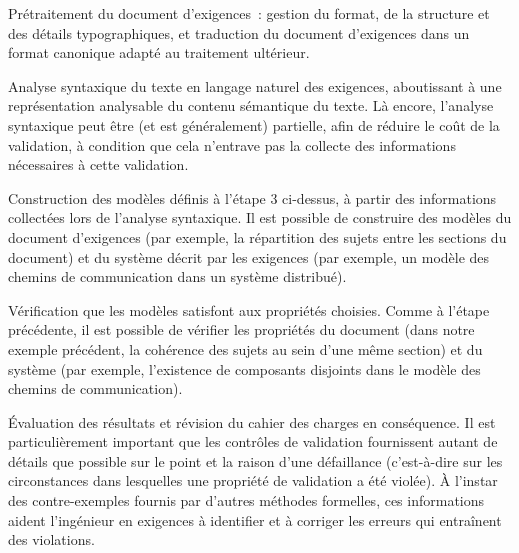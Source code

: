 {{    \item[][---] Prétraitement du document d'exigences~: gestion du format, de la structure et des détails typographiques, et traduction du document d'exigences dans un format canonique adapté au traitement ultérieur.
    \item[][---] Analyse syntaxique du texte en langage naturel des exigences, aboutissant à une représentation analysable du contenu sémantique du texte. Là encore, l'analyse syntaxique peut être (et est généralement) partielle, afin de réduire le coût de la validation, à condition que cela n'entrave pas la collecte des informations nécessaires à cette validation.
    \item[][---] Construction des modèles définis à l'étape 3 ci-dessus, à partir des informations collectées lors de l'analyse syntaxique. Il est possible de construire des modèles du document d'exigences (par exemple, la répartition des sujets entre les sections du document) et du système décrit par les exigences (par exemple, un modèle des chemins de communication dans un système distribué).
    \item[][---] Vérification que les modèles satisfont aux propriétés choisies. Comme à l'étape précédente, il est possible de vérifier les propriétés du document (dans notre exemple précédent, la cohérence des sujets au sein d'une même section) et du système (par exemple, l'existence de composants disjoints dans le modèle des chemins de communication).
    \item[][---] Évaluation des résultats et révision du cahier des charges en conséquence. Il est particulièrement important que les contrôles de validation fournissent autant de détails que possible sur le point et la raison d'une défaillance (c'est-à-dire sur les circonstances dans lesquelles une propriété de validation a été violée). À l'instar des contre-exemples fournis par d'autres méthodes formelles, ces informations aident l'ingénieur en exigences à identifier et à corriger les erreurs qui entraînent des violations.
}{\cite{gervasi_lightweight_2002}}
\vspace{-1\baselineskip}
}{}

